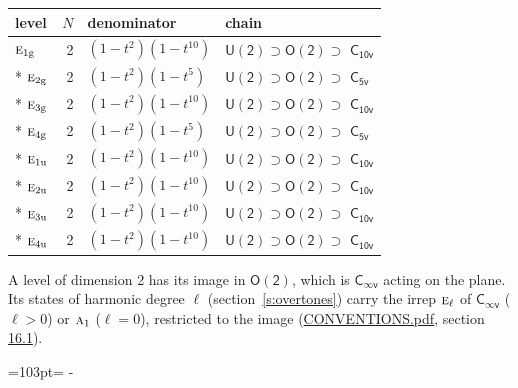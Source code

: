 \documentclass[10pt,a4paper]{article}
\newcommand{\needspace}[1]{\par\penalty-100\begingroup\dimen0=#1\relax\dimen2=\pagegoal
  \advance\dimen2-\pagetotal\ifdim\dimen0>\dimen2\relax\ifdim\dimen2>0pt\vfil\break\fi\fi
  \endgroup}
\numberwithin{equation}{section}
\newcommand{\grp}[1]{\mathsf{#1}}
\newcommand{\irr}[1]{\text{\normalfont\scshape #1}}
\newcommand{\ptag}[1]{\mathrm{#1}}
\begin{document}
{\small\begin{longtable}{@{}lrll@{}}\toprule
level & $N$ & denominator & chain\\\midrule\endhead
\bottomrule\endfoot\endlastfoot
$\irr{e}_{1\ptag{g}}$ & 2 & $(1-t^{2})(1-t^{10})$ & $\grp{U(2)} \supset \grp{O(2)} \supset$ \href{C10v.pdf}{$\grp{C_{10v}}$}\\*
$\irr{e}_{2\ptag{g}}$ & 2 & $(1-t^{2})(1-t^{5})$ & $\grp{U(2)} \supset \grp{O(2)} \supset$ \href{C5v.pdf}{$\grp{C_{5v}}$}\\*
$\irr{e}_{3\ptag{g}}$ & 2 & $(1-t^{2})(1-t^{10})$ & $\grp{U(2)} \supset \grp{O(2)} \supset$ \href{C10v.pdf}{$\grp{C_{10v}}$}\\*
$\irr{e}_{4\ptag{g}}$ & 2 & $(1-t^{2})(1-t^{5})$ & $\grp{U(2)} \supset \grp{O(2)} \supset$ \href{C5v.pdf}{$\grp{C_{5v}}$}\\*
$\irr{e}_{1\ptag{u}}$ & 2 & $(1-t^{2})(1-t^{10})$ & $\grp{U(2)} \supset \grp{O(2)} \supset$ \href{C10v.pdf}{$\grp{C_{10v}}$}\\*
$\irr{e}_{2\ptag{u}}$ & 2 & $(1-t^{2})(1-t^{10})$ & $\grp{U(2)} \supset \grp{O(2)} \supset$ \href{C10v.pdf}{$\grp{C_{10v}}$}\\*
$\irr{e}_{3\ptag{u}}$ & 2 & $(1-t^{2})(1-t^{10})$ & $\grp{U(2)} \supset \grp{O(2)} \supset$ \href{C10v.pdf}{$\grp{C_{10v}}$}\\*
$\irr{e}_{4\ptag{u}}$ & 2 & $(1-t^{2})(1-t^{10})$ & $\grp{U(2)} \supset \grp{O(2)} \supset$ \href{C10v.pdf}{$\grp{C_{10v}}$}\\
\bottomrule\end{longtable}}
A level of dimension 2 has its image in $\grp{O(2)}$, which is \href{Cinfv.pdf}{$\grp{C_{\infty v}}$} acting on the plane. \label{n:index.harmonic.degree}Its states of harmonic degree $\ell$ (section~\ref{s:overtones}) carry the irrep $\irr{e}_{\ell}$ of \href{Cinfv.pdf}{$\grp{C_{\infty v}}$} ($\ell > 0$) or $\irr{a}_{1}$ ($\ell = 0$), restricted to the image (\href{../../CONVENTIONS.pdf}{CONVENTIONS.pdf}, section \href{../../CONVENTIONS.pdf\#conv.16.1}{16.1}).
\needspace{103pt}
\end{document}
